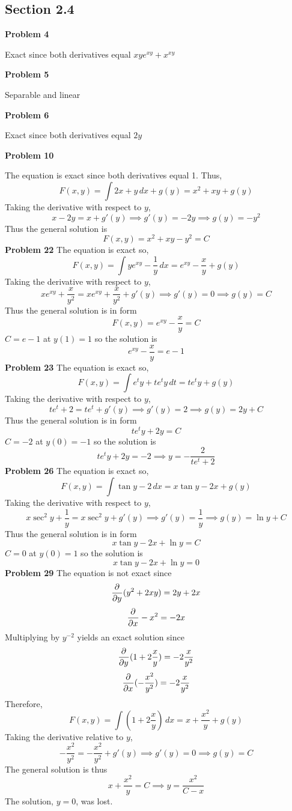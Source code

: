 \subsection*{Section 2.4}
\textbf{Problem 4}

Exact since both derivatives equal $xye^{xy}+x^{xy}$

\textbf{Problem 5}

Separable and linear

\textbf{Problem 6}

Exact since both derivatives equal $2y$

\textbf{Problem 10}

The equation is exact since both derivatives equal 1.
Thus, 
\[
    F(x,y) = \int 2x + y \,dx + g(y) = x^2 + xy + g(y)
\]
Taking the derivative with respect to $y$, 
\[
    x-2y = x + g'(y)
    \implies g'(y) = -2y
    \implies g(y) = -y^2
\]
Thus the general solution is
\[
    F(x,y) = x^2 + xy - y^2 = C
\]
\textbf{Problem 22}
The equation is exact so, 
\[
    F(x, y) 
    = \int ye^{xy}-\frac{1}{y} \,dx 
    = e^{xy} - \frac{x}{y} + g(y)
\]
Taking the derivative with respect to $y$,
\[
    xe^{xy}+\frac{x}{y^2} = xe^{xy} + \frac{x}{y^2} + g'(y)
    \implies  g'(y) = 0 
    \implies g(y) = C
\]
Thus the general solution is in form 
\[
    F(x, y) = e^{xy} - \frac{x}{y}  = C
\]
$C = e-1$ at $y(1) = 1$ so the solution is 
\[
    e^{xy} - \frac{x}{y}  = e-1
\]
\textbf{Problem 23}
The equation is exact so,
\[
    F(x, y)
    = \int e^ty + te^ty \,dt 
    = te^ty + g(y)
\]
Taking the derivative with respect to $y$,
\[
    te^t+2 = te^t + g'(y)
    \implies g'(y) = 2
    \implies g(y) = 2y+C
\]
Thus the general solution is in form 
\[
    te^ty + 2y = C
\]
$C = -2$ at $y(0) = -1$ so the solution is 
\[
    te^ty + 2y = -2
    \implies y = -\frac{2}{te^t+2}
\]
\textbf{Problem 26}
The equation is exact so,
\[
    F(x,y)
    = \int \tan y - 2 \,dx 
    = x\tan y - 2x + g(y)
\]
Taking the derivative with respect to $y$,
\[
    x\sec^2y + \frac{1}{y} = x\sec^2 y + g'(y)
    \implies g'(y) = \frac{1}{y}
    \implies g(y) = \ln y + C
\]
Thus the general solution is in form 
\[
    x\tan y - 2x + \ln y = C
\]
$C= 0$ at $y(0) = 1$ so the solution is 
\[
    x\tan y - 2x + \ln y = 0
\]
\textbf{Problem 29}
The equation is not exact since 
\[
    \frac{\partial^{} }{\partial y^{}} (y^2+2xy) = 2y+2x
\]
\[
    \frac{\partial^{} }{\partial x^{}} -x^2 = -2x
\]
Multiplying by $y^{-2}$ yields an exact solution since
\[
    \frac{\partial^{} }{\partial y^{}} (1+2\frac{x}{y}) = -2\frac{x}{y^2}
\]
\[
    \frac{\partial^{} }{\partial x^{}} (-\frac{x^2}{y^2}) = -2\frac{x}{y^2}
\]
Therefore,
\[
    F(x, y) 
    = \int (1+2\frac{x}{y}) \, dx 
    = x + \frac{x^2}{y} + g(y)
\]
Taking the derivative relative to $y$,
\[
    -\frac{x^2}{y^2} = - \frac{x^2}{y^2} + g'(y)
    \implies g'(y) = 0
    \implies g(y) = C
\]
The general solution is thus 
\[
    x + \frac{x^2}{y} = C
    \implies y = \frac{x^2}{C-x}
\]
The solution, $y=0$, was lost.